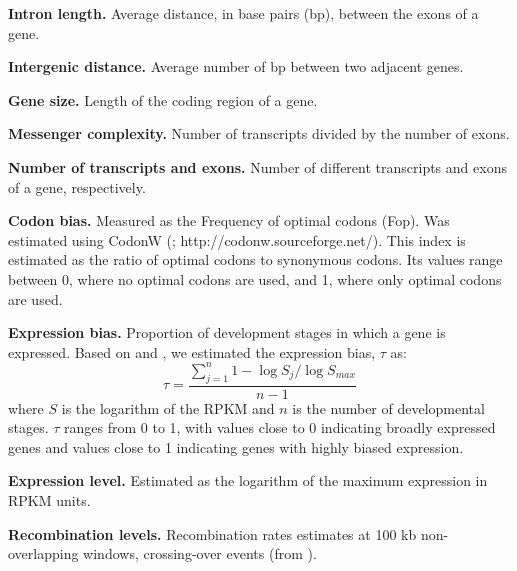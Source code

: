 \textbf{Intron length.} Average distance, in base pairs (bp), between the exons of a gene.

\textbf{Intergenic distance.} Average number of bp between two adjacent genes.

\textbf{Gene size.} Length of the coding region of a gene.

\textbf{Messenger complexity.} Number of transcripts divided by the number of exons.

\textbf{Number of transcripts and exons.} Number of different transcripts and exons of a gene, respectively.

\textbf{Codon bias.} Measured as the Frequency of optimal codons (Fop). Was estimated using CodonW (\citealp{Peden1999}; http://codonw.sourceforge.net/).
This index is estimated as the ratio of optimal codons to synonymous codons. Its values range between 0, where no optimal codons are used, and 1, where only optimal codons are used.

\textbf{Expression bias.} Proportion of development stages in which a gene is expressed. Based on \citep{Yanai2005} and \citep{Larracuente2008}, we estimated the expression bias, $\tau$ as:
%
$$ \tau = \frac{ \sum_{j=1}^{n} 1- \log S_{j} / \log S_{max} }  { n-1 } $$
%
where $S$ is the logarithm of the RPKM and $n$ is the number of developmental stages. $\tau$ ranges from 0 to 1, with values close to 0 indicating broadly expressed genes and values close to 1 indicating genes with highly biased expression.

\textbf{Expression level.} Estimated as the logarithm of the maximum expression in RPKM units.

\textbf{Recombination levels.} Recombination rates estimates at 100 kb non-overlapping windows, crossing-over events (from \citealp{Comeron2012}).
